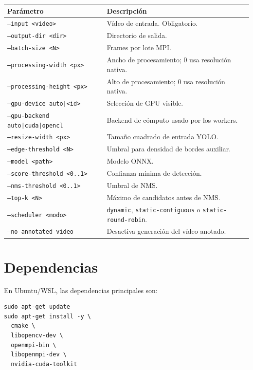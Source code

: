 \documentclass[12pt,a4paper]{article}
\begin{document}
\begin{longtable}{p{}p{}}
\toprule
\textbf{Par\'ametro} & \textbf{Descripci\'on} \\
\midrule
\texttt{--input <video>} & V\'ideo de entrada. Obligatorio. \\
\texttt{--output-dir <dir>} & Directorio de salida. \\
\texttt{--batch-size <N>} & Frames por lote MPI. \\
\texttt{--processing-width <px>} & Ancho de procesamiento; 0 usa resoluci\'on nativa. \\
\texttt{--processing-height <px>} & Alto de procesamiento; 0 usa resoluci\'on nativa. \\
\texttt{--gpu-device auto|<id>} & Selecci\'on de GPU visible. \\
\texttt{--gpu-backend auto|cuda|opencl} & Backend de c\'omputo usado por los workers. \\
\texttt{--resize-width <px>} & Tama\~no cuadrado de entrada YOLO. \\
\texttt{--edge-threshold <N>} & Umbral para densidad de bordes auxiliar. \\
\texttt{--model <path>} & Modelo ONNX. \\
\texttt{--score-threshold <0..1>} & Confianza m\'inima de detecci\'on. \\
\texttt{--nms-threshold <0..1>} & Umbral de NMS. \\
\texttt{--top-k <N>} & M\'aximo de candidatos antes de NMS. \\
\texttt{--scheduler <modo>} & \texttt{dynamic}, \texttt{static-contiguous} o \texttt{static-round-robin}. \\
\texttt{--no-annotated-video} & Desactiva generaci\'on del v\'ideo anotado. \\
\bottomrule
\end{longtable}

\section{Dependencias}

En Ubuntu/WSL, las dependencias principales son:

\begin{lstlisting}[style=console]
sudo apt-get update
sudo apt-get install -y \
  cmake \
  libopencv-dev \
  openmpi-bin \
  libopenmpi-dev \
  nvidia-cuda-toolkit
\end{lstlisting}
\end{document}
